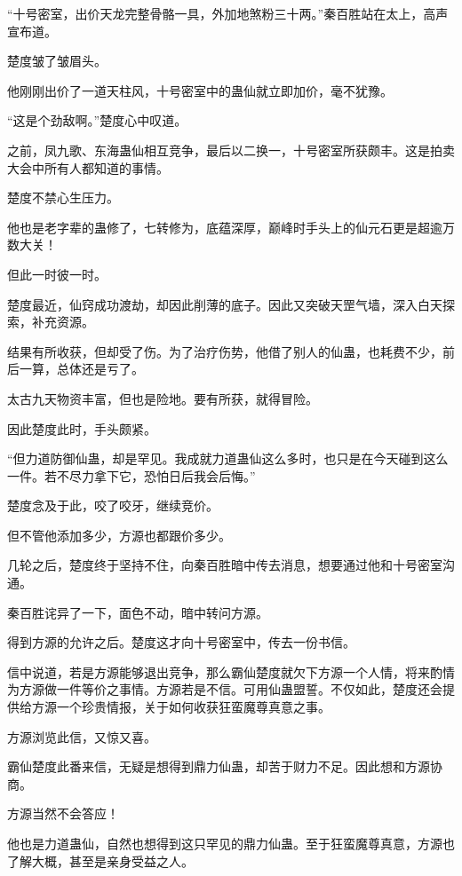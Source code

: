 
\begin{this_body}

“十号密室，出价天龙完整骨骼一具，外加地煞粉三十两。”秦百胜站在太上，高声宣布道。

楚度皱了皱眉头。

他刚刚出价了一道天柱风，十号密室中的蛊仙就立即加价，毫不犹豫。

“这是个劲敌啊。”楚度心中叹道。

之前，凤九歌、东海蛊仙相互竞争，最后以二换一，十号密室所获颇丰。这是拍卖大会中所有人都知道的事情。

楚度不禁心生压力。

他也是老字辈的蛊修了，七转修为，底蕴深厚，巅峰时手头上的仙元石更是超逾万数大关！

但此一时彼一时。

楚度最近，仙窍成功渡劫，却因此削薄的底子。因此又突破天罡气墙，深入白天探索，补充资源。

结果有所收获，但却受了伤。为了治疗伤势，他借了别人的仙蛊，也耗费不少，前后一算，总体还是亏了。

太古九天物资丰富，但也是险地。要有所获，就得冒险。

因此楚度此时，手头颇紧。

“但力道防御仙蛊，却是罕见。我成就力道蛊仙这么多时，也只是在今天碰到这么一件。若不尽力拿下它，恐怕日后我会后悔。”

楚度念及于此，咬了咬牙，继续竞价。

但不管他添加多少，方源也都跟价多少。

几轮之后，楚度终于坚持不住，向秦百胜暗中传去消息，想要通过他和十号密室沟通。

秦百胜诧异了一下，面色不动，暗中转问方源。

得到方源的允许之后。楚度这才向十号密室中，传去一份书信。

信中说道，若是方源能够退出竞争，那么霸仙楚度就欠下方源一个人情，将来酌情为方源做一件等价之事情。方源若是不信。可用仙蛊盟誓。不仅如此，楚度还会提供给方源一个珍贵情报，关于如何收获狂蛮魔尊真意之事。

方源浏览此信，又惊又喜。

霸仙楚度此番来信，无疑是想得到鼎力仙蛊，却苦于财力不足。因此想和方源协商。

方源当然不会答应！

他也是力道蛊仙，自然也想得到这只罕见的鼎力仙蛊。至于狂蛮魔尊真意，方源也了解大概，甚至是亲身受益之人。


\end{this_body}
